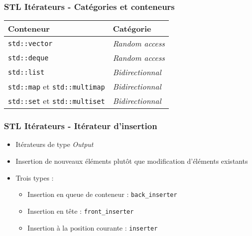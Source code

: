 \documentclass[C++.tex]{subfiles}
\begin{document}
\begin{frame}
	\frametitle{STL Itérateurs - Catégories et conteneurs}
	\begin{tabular}{ | p{5cm} | p{5cm} |}
		\hline
		Conteneur & Catégorie \\ 
		\hline
		\lstinline{std::vector} & \textit{Random access} \\ 
		\hline
		\lstinline{std::deque} & \textit{Random access} \\ 
		\hline
		\lstinline{std::list} & \textit{Bidirectionnal} \\ 
		\hline
		\lstinline{std::map} et \lstinline{std::multimap} & \textit{Bidirectionnal} \\ 
		\hline
		\lstinline{std::set} et \lstinline{std::multiset} & \textit{Bidirectionnal} \\ 
		\hline
	\end{tabular} 
\end{frame}

\begin{frame}
	\frametitle{STL Itérateurs - Itérateur d'insertion}
	\begin{itemize}
		\item Itérateurs de type \textit{Output}
		\item Insertion de nouveaux éléments plutôt que modification d'éléments existants


		\item Trois types :
		\begin{itemize}
			\item Insertion en queue de conteneur : \lstinline|back_inserter|
			\item Insertion en tête : \lstinline|front_inserter|
			\item Insertion à la position courante : \lstinline|inserter|


		\end{itemize}
	\end{itemize}
\end{frame}
\end{document}

